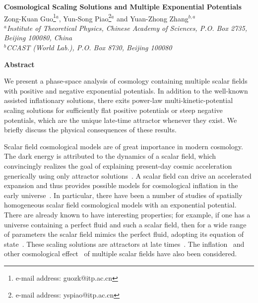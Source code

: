 \documentclass[a4paper,12pt]{article}
\begin{document}
\baselineskip=16pt
\begin{titlepage}
\setcounter{page}{0}
\begin{center}

\vspace{0.5cm} {\Large \bf Cosmological Scaling Solutions and
Multiple Exponential Potentials }\\
\vspace{10mm}
Zong-Kuan Guo\footnote{e-mail address: guozk@itp.ac.cn}$^{a}$,
Yun-Song Piao\footnote{e-mail address: yspiao@itp.ac.cn}$^{a}$
and
Yuan-Zhong Zhang$^{b,a}$ \\
\vspace{6mm} {\footnotesize{\it
  $^a$Institute of Theoretical Physics, Chinese Academy of Sciences,
      P.O. Box 2735, Beijing 100080, China\\
  $^b$CCAST (World Lab.), P.O. Box 8730, Beijing 100080\\}}

\vspace*{5mm} \normalsize
\smallskip
\medskip
\smallskip
\end{center}
\vskip0.6in \centerline{\large\bf Abstract} {We present a
phase-space analysis of cosmology containing multiple scalar
fields with positive and negative exponential potentials.
In addition to the well-known assisted inflationary solutions,
there exits power-law multi-kinetic-potential scaling solutions
for sufficiently flat positive potentials or steep negative
potentials, which are the unique late-time attractor whenever they
exist. We briefly discuss the physical consequences of these
results.}

\vspace*{2mm}
\end{titlepage}



Scalar field cosmological models are of great importance in modern
cosmology. The dark energy is attributed to the dynamics of a
scalar field, which convincingly realizes the goal of explaining
present-day cosmic acceleration generically using only attractor
solutions~\cite{CD}. A scalar field can drive an accelerated
expansion and thus provides possible models for cosmological
inflation in the early universe~\cite{GU}. In particular, there
have been a number of studies of spatially homogeneous scalar
field cosmological models with an exponential potential. There are
already known to have interesting properties; for example, if one
has a universe containing a perfect fluid and such a scalar field,
then for a wide range of parameters the scalar field mimics the
perfect fluid, adopting its equation of state~\cite{CL}. These
scaling solutions are attractors at late times~\cite{ST}. The
inflation~\cite{LM, PCZ} and other cosmological effect~\cite{HL}
of multiple scalar fields have also been considered.
\end{document}
